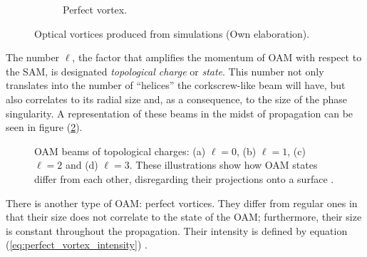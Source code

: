 \begin{figure}[htbp]
\begin{subfigure}[b]{0.45\textwidth}
        \caption{Perfect vortex.}
    \end{subfigure}
    \caption{Optical vortices produced from simulations (Own elaboration).}
    \label{fig:Example_OAM}
\end{figure}

The number $\ell$, the factor that amplifies the momentum of OAM with respect to the SAM, is designated \textit{topological charge} or \textit{state}. This number not only translates into the number of ``helices'' the corkscrew-like beam will have, but also correlates to its radial size and, as a consequence, to the size of the phase singularity. A representation of these beams in the midst of propagation can be seen in figure (\ref{fig:Different_OAM_Beams}).


\begin{figure}[htbp]
    \centering
    \caption{OAM beams of topological charges: (a) $\ell = 0$, (b) $\ell = 1$, (c) $\ell = 2$ and (d) $\ell = 3$. These illustrations show how OAM states differ from each other, disregarding their projections onto a surface \protect\cite{Yao-Padgett:2011}.}
    \label{fig:Different_OAM_Beams}
\end{figure}

There is another type of OAM: perfect vortices. They differ from regular ones in that their size does not correlate to the state of the OAM; furthermore, their size is constant throughout the propagation. Their intensity is defined by equation (\ref{eq:perfect_vortex_intensity}) \cite{Thesis_Herbert_PerfectVortices:2020}. 


